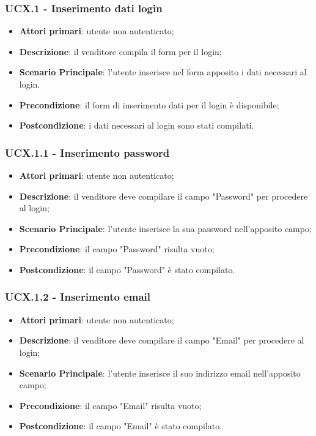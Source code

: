 \subsubsection{UCX.1 - Inserimento dati login}
\begin{itemize}
\item \textbf{Attori primari}: utente non autenticato;
\item \textbf{Descrizione}: il venditore compila il form per il login;
\item \textbf{Scenario Principale}: l'utente inserisce nel form apposito i dati necessari al login.
\item \textbf{Precondizione}: il form di inserimento dati per il login è disponibile;
\item \textbf{Postcondizione}: i dati necessari al login sono stati compilati.
\end{itemize}

\subsubsection{UCX.1.1 - Inserimento password}
\begin{itemize}
\item \textbf{Attori primari}: utente non autenticato;
\item \textbf{Descrizione}: il venditore deve compilare il campo "Password" per procedere al login;
\item \textbf{Scenario Principale}: l'utente inserisce la sua password nell'apposito campo;
\item \textbf{Precondizione}: il campo "Password" risulta vuoto;
\item \textbf{Postcondizione}: il campo "Password" è stato compilato.
\end{itemize}

\subsubsection{UCX.1.2 - Inserimento email}
\begin{itemize}
\item \textbf{Attori primari}: utente non autenticato;
\item \textbf{Descrizione}: il venditore deve compilare il campo "Email" per procedere al login;
\item \textbf{Scenario Principale}: l'utente inserisce il suo indirizzo email nell'apposito campo;
\item \textbf{Precondizione}: il campo "Email" risulta vuoto;
\item \textbf{Postcondizione}: il campo "Email" è stato compilato.
\end{itemize}

